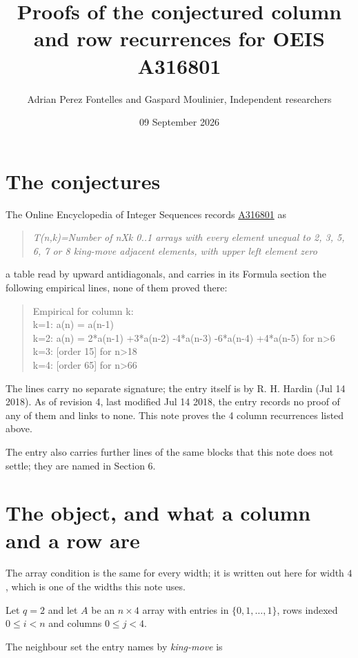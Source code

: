 \documentclass[11pt]{article}
\title{Proofs of the conjectured column and row recurrences for OEIS A316801}
\author{Adrian Perez Fontelles and Gaspard Moulinier, Independent researchers}
\date{09 September 2026}
\theoremstyle{definition}
\begin{document}
\maketitle
\section{The conjectures}

The Online Encyclopedia of Integer Sequences records \href{https://oeis.org/A316801}{A316801} as

\begin{quote}\itshape T(n,k)=Number of nXk 0..1 arrays with every element unequal to 2, 3, 5, 6, 7 or 8 king-move adjacent elements, with upper left element zero\end{quote}

a table read by upward antidiagonals, and carries in its Formula section the following empirical lines, none of them proved there:

\begin{quote}\ttfamily Empirical for column k:\\
k=1: a(n) = a(n-1)\\k=2: a(n) = 2*a(n-1) +3*a(n-2) -4*a(n-3) -6*a(n-4) +4*a(n-5) for n>6\\k=3: [order 15] for n>18\\k=4: [order 65] for n>66\end{quote}

The lines carry no separate signature; the entry itself is by R. H. Hardin (Jul 14 2018). As of revision 4, last modified Jul 14 2018, the entry records no proof of any of them and links to none. This note proves the 4 column recurrences listed above.

The entry also carries further lines of the same blocks that this note does not settle; they are named in Section 6.

\section{The object, and what a column and a row are}

The array condition is the same for every width; it is written out here for width $4$, which is one of the widths this note uses.

Let $q = 2$ and let $A$ be an $n \times 4$ array with entries in $\{0,1,\dots,1\}$, rows indexed $0 \le i < n$ and columns $0 \le j < 4$.

The neighbour set the entry names by {\itshape king-move} is
\end{document}
